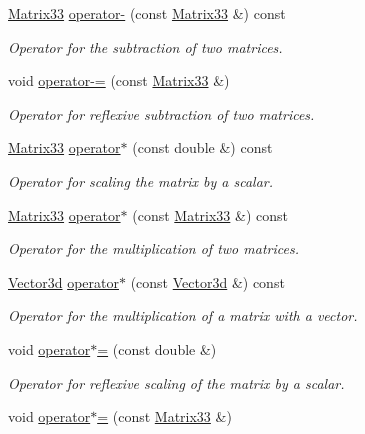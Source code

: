 \begin{DoxyCompactItemize}
\hyperlink{classMatrix33}{Matrix33} \hyperlink{classMatrix33_a372f71ec208bb6d3045acd4324b7cb06}{operator-\/} (const \hyperlink{classMatrix33}{Matrix33} \&) const 
\begin{DoxyCompactList}\small\item\em Operator for the subtraction of two matrices. \end{DoxyCompactList}\item 
void \hyperlink{classMatrix33_abc889e10a9c7c532195c7031c1344a74}{operator-\/=} (const \hyperlink{classMatrix33}{Matrix33} \&)
\begin{DoxyCompactList}\small\item\em Operator for reflexive subtraction of two matrices. \end{DoxyCompactList}\item 
\hyperlink{classMatrix33}{Matrix33} \hyperlink{classMatrix33_a6992fd2bb0b6e9ad71b5d3481c4e3e1a}{operator$\ast$} (const double \&) const 
\begin{DoxyCompactList}\small\item\em Operator for scaling the matrix by a scalar. \end{DoxyCompactList}\item 
\hyperlink{classMatrix33}{Matrix33} \hyperlink{classMatrix33_a525f14614255ff81c0cbab8060e8e065}{operator$\ast$} (const \hyperlink{classMatrix33}{Matrix33} \&) const 
\begin{DoxyCompactList}\small\item\em Operator for the multiplication of two matrices. \end{DoxyCompactList}\item 
\hyperlink{classVector3d}{Vector3d} \hyperlink{classMatrix33_a601584a1edbaae7c6a2a2874605d6f61}{operator$\ast$} (const \hyperlink{classVector3d}{Vector3d} \&) const 
\begin{DoxyCompactList}\small\item\em Operator for the multiplication of a matrix with a vector. \end{DoxyCompactList}\item 
void \hyperlink{classMatrix33_a83162791813bef030b1ceb5df3c5cae3}{operator$\ast$=} (const double \&)
\begin{DoxyCompactList}\small\item\em Operator for reflexive scaling of the matrix by a scalar. \end{DoxyCompactList}\item 
void \hyperlink{classMatrix33_ac3937bdeb034cc83b4adcad16cd58a26}{operator$\ast$=} (const \hyperlink{classMatrix33}{Matrix33} \&)

\end{DoxyCompactItemize}
